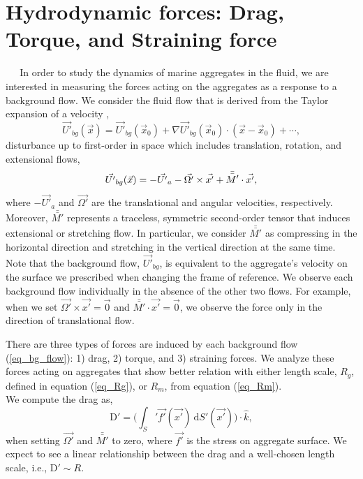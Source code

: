 \section{Hydrodynamic forces: Drag, Torque, and Straining force}
$\ \ \ \ \ $  
In order to study the dynamics of marine aggregates in the fluid, we are interested in measuring the forces acting on the aggregates as a response to a background flow. We consider the fluid  flow that is derived from the Taylor expansion of a velocity \cite{guazzelli_physical_2011},
\[
 \vec{U'}_{bg}(\vec{x})
  =  \vec{U'}_{bg}(\vec{x}_0) + 
  \nabla  \vec{U'}_{bg}(\vec{x}_0) \cdot (\vec{x} - \vec{x}_0) + \cdots,
\]
 disturbance up to first-order in space which includes translation, rotation, and extensional flows,
\begin{equation}
 \vec{U'}_{bg}(\vec{x}) = -\vec{U'}_a -  \vec{\Omega'} \times \vec{x'}+\Bar{\Bar{M'}} \cdot \vec{x'},
 \label{eq_bg_flow}
\end{equation}
where $-\vec{U'}_a$ and $\vec{\Omega'}$ are the translational and angular velocities, respectively. 
Moreover, $\bar{\bar{M'}}$ represents a traceless, symmetric second-order tensor that induces extensional or stretching flow. In particular, we consider $\bar{\bar{M'}}$ as compressing in the horizontal direction and stretching in the vertical direction at the same time. 
Note that the background flow, $\vec{U'}_{bg}$, is equivalent to the aggregate's velocity on the surface we prescribed when changing the frame of reference.
We observe each background flow individually in the absence of the other two flows. For example, when we set $\vec{\Omega'} \times \vec{x'} = \vec{0}$ and $\bar{\bar{M'}} \cdot \vec{x'} = \vec{0}$, we observe the force only in the direction of translational flow. 
\par
There are three types of forces are induced by each background flow (\ref{eq_bg_flow}):
 1) drag, 2) torque, and 3) straining forces. We analyze these forces acting on aggregates that show better relation with either length scale, $R_g$, defined in equation (\ref{eq_Rg}), or $R_m$, from equation (\ref{eq_Rm}). 
\\
We compute the drag as,
\begin{equation}
\text{D}' =  \Biggl( \int_S' \vec{f'} (\vec{x'}) \ \text{d} S'(\vec{x'}) \Biggr) \cdot \hat{k},
\end{equation}
when setting $\vec{\Omega'}$ and $\bar{\bar{M'}}$ to zero, 
where $\vec{f'}$ is the stress on aggregate surface. 
We expect to see a linear relationship between the drag and a well-chosen length scale, i.e., D$' \sim R$. 
